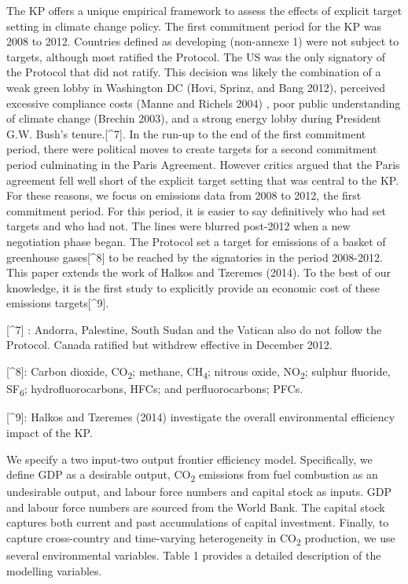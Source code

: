 \documentclass[
  letterpaper,
  DIV=11,
  numbers=noendperiod]{scrartcl}
\begin{document}
The KP offers a unique empirical framework to assess the effects of
explicit target setting in climate change policy. The first commitment
period for the KP was 2008 to 2012. Countries defined as developing
(non-annexe 1) were not subject to targets, although most ratified the
Protocol. The US was the only signatory of the Protocol that did not
ratify. This decision was likely the combination of a weak green lobby
in Washington DC (Hovi, Sprinz, and Bang 2012), perceived excessive
compliance costs (Manne and Richels 2004) , poor public understanding of
climate change (Brechin 2003), and a strong energy lobby during
President G.W. Bush's tenure.{[}\^{}7{]}. In the run-up to the end of
the first commitment period, there were political moves to create
targets for a second commitment period culminating in the Paris
Agreement. However critics argued that the Paris agreement fell well
short of the explicit target setting that was central to the KP. For
these reasons, we focus on emissions data from 2008 to 2012, the first
commitment period. For this period, it is easier to say definitively who
had set targets and who had not. The lines were blurred post-2012 when a
new negotiation phase began. The Protocol set a target for emissions of
a basket of greenhouse gases{[}\^{}8{]} to be reached by the signatories
in the period 2008-2012. This paper extends the work of Halkos and
Tzeremes (2014). To the best of our knowledge, it is the first study to
explicitly provide an economic cost of these emissions
targets{[}\^{}9{]}.

{[}\^{}7{]} : Andorra, Palestine, South Sudan and the Vatican also do
not follow the Protocol. Canada ratified but withdrew effective in
December 2012.

{[}\^{}8{]}: Carbon dioxide, CO\textsubscript{2}; methane,
CH\textsubscript{4}; nitrous oxide, NO\textsubscript{2}; sulphur
fluoride, SF\textsubscript{6}; hydrofluorocarbons, HFCs; and
perfluorocarbons; PFCs.

{[}\^{}9{]}: Halkos and Tzeremes (2014) investigate the overall
environmental efficiency impact of the KP.

We specify a two input-two output frontier efficiency model.
Specifically, we define GDP as a desirable output, CO\textsubscript{2}
emissions from fuel combustion as an undesirable output, and labour
force numbers and capital stock as inputs. GDP and labour force numbers
are sourced from the World Bank. The capital stock captures both current
and past accumulations of capital investment. Finally, to capture
cross-country and time-varying heterogeneity in CO\textsubscript{2}
production, we use several environmental variables. Table 1 provides a
detailed description of the modelling variables.
\end{document}
